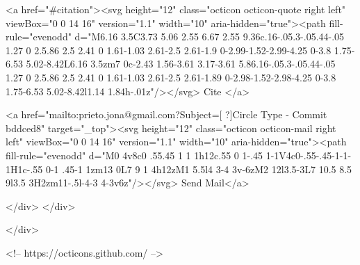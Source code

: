       <a  href="#citation"><svg height="12" class="octicon octicon-quote right left" viewBox="0 0 14 16" version="1.1" width="10" aria-hidden="true"><path fill-rule="evenodd" d="M6.16 3.5C3.73 5.06 2.55 6.67 2.55 9.36c.16-.05.3-.05.44-.05 1.27 0 2.5.86 2.5 2.41 0 1.61-1.03 2.61-2.5 2.61-1.9 0-2.99-1.52-2.99-4.25 0-3.8 1.75-6.53 5.02-8.42L6.16 3.5zm7 0c-2.43 1.56-3.61 3.17-3.61 5.86.16-.05.3-.05.44-.05 1.27 0 2.5.86 2.5 2.41 0 1.61-1.03 2.61-2.5 2.61-1.89 0-2.98-1.52-2.98-4.25 0-3.8 1.75-6.53 5.02-8.42l1.14 1.84h-.01z"/></svg> Cite
      </a>

      <a href="mailto:prieto.jona@gmail.com?Subject=[ ?]Circle Type - Commit bddced8" target="_top"><svg height="12" class="octicon octicon-mail right left" viewBox="0 0 14 16" version="1.1" width="10" aria-hidden="true"><path fill-rule="evenodd" d="M0 4v8c0 .55.45 1 1 1h12c.55 0 1-.45 1-1V4c0-.55-.45-1-1-1H1c-.55 0-1 .45-1 1zm13 0L7 9 1 4h12zM1 5.5l4 3-4 3v-6zM2 12l3.5-3L7 10.5 8.5 9l3.5 3H2zm11-.5l-4-3 4-3v6z"/></svg> Send Mail</a>

    </div>
  </div>

</div>

<!-- https://octicons.github.com/ -->





